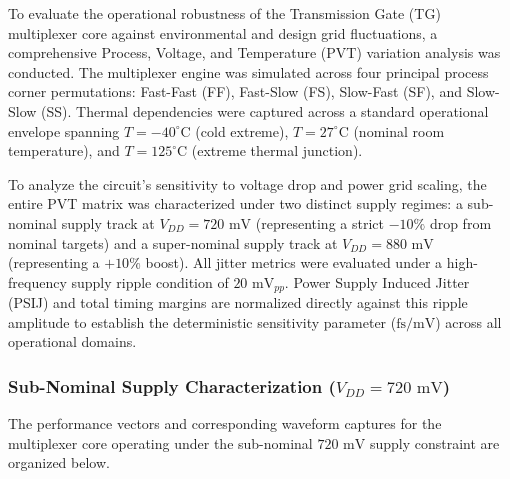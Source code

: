 To evaluate the operational robustness of the  Transmission Gate (TG) multiplexer core against environmental and design grid fluctuations, a comprehensive Process, Voltage, and Temperature (PVT) variation analysis was conducted. The multiplexer engine was simulated across four principal process corner permutations: Fast-Fast (FF), Fast-Slow (FS), Slow-Fast (SF), and Slow-Slow (SS). Thermal dependencies were captured across a standard operational envelope spanning $T = -40^{\circ}\text{C}$ (cold extreme), $T = 27^{\circ}\text{C}$ (nominal room temperature), and $T = 125^{\circ}\text{C}$ (extreme thermal junction). 

To analyze the circuit's sensitivity to voltage drop and power grid scaling, the entire PVT matrix was characterized under two distinct supply regimes: a sub-nominal supply track at $V_{DD} = 720\text{ mV}$ (representing a strict $-10\%$ drop from nominal targets) and a super-nominal supply track at $V_{DD} = 880\text{ mV}$ (representing a $+10\%$ boost). All jitter metrics were evaluated under a high-frequency supply ripple condition of $20\text{ mV}_{pp}$. Power Supply Induced Jitter (PSIJ) and total timing margins are normalized directly against this ripple amplitude to establish the deterministic sensitivity parameter ($\text{fs/mV}$) across all operational domains.

\subsubsection*{Sub-Nominal Supply Characterization ($V_{DD} = 720\text{ mV}$)}

The performance vectors and corresponding waveform captures for the  multiplexer core operating under the sub-nominal $720\text{ mV}$ supply constraint are organized below.

